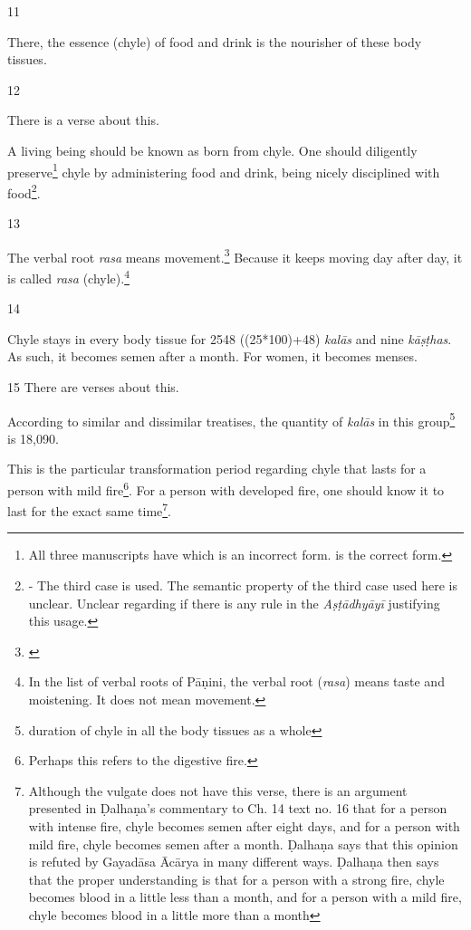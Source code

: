 \begin{translation}
\item [11]

There, the essence (chyle) of food and drink is the nourisher of these body tissues.


\item[12]

There is a verse about this.

\begin{sloka}
A living being should be known as born from chyle. One should diligently preserve\footnote{All three manuscripts have  which is an incorrect form.  is the correct form.} chyle by administering food and drink, being nicely disciplined with food\footnote{ - The third case is used. The semantic property of the third case used here is unclear. Unclear regarding if there is any rule in the \emph{Aṣṭādhyāyī} justifying this usage.}.
\end{sloka}

\item[13]

The verbal root \emph{rasa} means movement.\footnote{\cite[109]{kunj-1907}} Because it keeps moving day after day, it is called \emph{rasa} (chyle).\footnote{In the list of verbal roots of Pāṇini, the verbal root (\emph{rasa}) means taste and moistening. It does not mean movement.}    

\item[14]

Chyle stays in every body tissue for 2548 ((25*100)+48) \emph{kalās} and nine \emph{kāṣṭhas}. As such, it becomes semen after a month. For women, it becomes menses.  

\item[15] 
There are verses about this.

\begin{sloka}
According to similar and dissimilar treatises, the quantity of \emph{kalās} in this group\footnote{duration of chyle in all the body tissues as a whole} is 18,090.


This is the particular transformation period regarding chyle that lasts for a 
person with mild fire\footnote{Perhaps this refers to the digestive fire.}. For a 
person with developed fire, one should know it to last for the exact same 
time\footnote{Although the vulgate does not have this verse, there is an 
argument presented in Ḍalhaṇa's commentary \citep[63]{vulgate} to Ch. 14 text 
no. 16 that for a person with intense fire, chyle becomes semen after eight days, 
and for a person with mild fire, chyle becomes semen after a month. Ḍalhaṇa 
says that this opinion is refuted by Gayadāsa Ācārya in many different ways. 
Ḍalhaṇa then says that the proper understanding is that for a person with a 
strong fire, chyle becomes blood in a little less than a month, and for a person 
with a mild fire, chyle becomes blood in a little more than a month}.


\end{sloka}
\end{translation}
